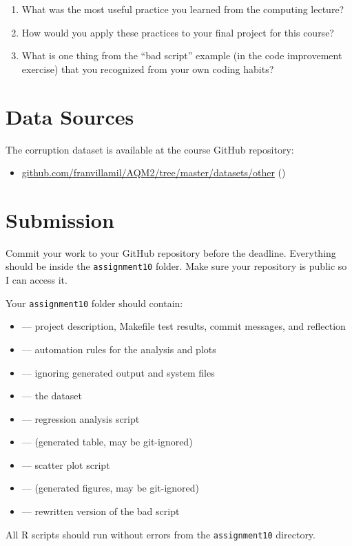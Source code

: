 \begin{enumerate}[label=\alph*)]
  \item What was the most useful practice you learned from the computing lecture?
  \item How would you apply these practices to your final project for this course?
  \item What is one thing from the ``bad script'' example (in the code improvement exercise) that you recognized from your own coding habits?
\end{enumerate}

\vspace{15pt}

\section{Data Sources}

The corruption dataset is available at the course GitHub repository:
\begin{itemize}
  \item \href{https://github.com/franvillamil/AQM2/tree/master/datasets/other}{github.com/franvillamil/AQM2/tree/master/datasets/other} ()
\end{itemize}

\vspace{15pt}

\section{Submission}

Commit your work to your GitHub repository before the deadline. Everything should be inside the \texttt{assignment10} folder. Make sure your repository is public so I can access it.

Your \texttt{assignment10} folder should contain:
\begin{itemize}
  \item {} --- project description, Makefile test results, commit messages, and reflection
  \item {} --- automation rules for the analysis and plots
  \item {} --- ignoring generated output and system files
  \item {} --- the dataset
  \item {} --- regression analysis script
  \item {} --- (generated table, may be git-ignored)
  \item {} --- scatter plot script
  \item {} --- (generated figures, may be git-ignored)
  \item {} --- rewritten version of the bad script
\end{itemize}

All R scripts should run without errors from the \texttt{assignment10} directory.



